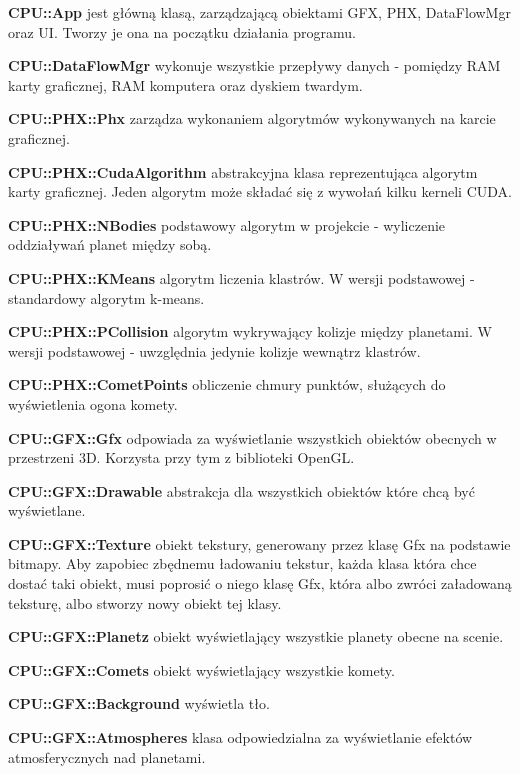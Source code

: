 \begin{description}
\item{\bf CPU::App} jest główną klasą, zarządzającą obiektami GFX, PHX, DataFlowMgr oraz UI. Tworzy je ona na początku działania programu.
\item{\bf CPU::DataFlowMgr} wykonuje wszystkie przepływy danych - pomiędzy RAM karty graficznej, RAM komputera oraz dyskiem twardym.
\item{}
\item{\bf CPU::PHX::Phx} zarządza wykonaniem algorytmów wykonywanych na karcie graficznej.
\item{\bf CPU::PHX::CudaAlgorithm} abstrakcyjna klasa reprezentująca algorytm karty graficznej. Jeden algorytm może składać się z wywołań kilku kerneli CUDA.
\item{\bf CPU::PHX::NBodies} podstawowy algorytm w projekcie - wyliczenie oddziaływań planet między sobą.
\item{\bf CPU::PHX::KMeans} algorytm liczenia klastrów. W wersji podstawowej - standardowy algorytm k-means.
\item{\bf CPU::PHX::PCollision} algorytm wykrywający kolizje między planetami. W wersji podstawowej - uwzględnia jedynie kolizje wewnątrz klastrów.
\item{\bf CPU::PHX::CometPoints} obliczenie chmury punktów, służących do wyświetlenia ogona komety.
\item{}
\item{\bf CPU::GFX::Gfx} odpowiada za wyświetlanie wszystkich obiektów obecnych w przestrzeni 3D. Korzysta przy tym z biblioteki OpenGL.
\item{\bf CPU::GFX::Drawable} abstrakcja dla wszystkich obiektów które chcą być wyświetlane.
\item{\bf CPU::GFX::Texture} obiekt tekstury, generowany przez klasę Gfx na podstawie bitmapy. Aby zapobiec zbędnemu ładowaniu tekstur, każda klasa która chce dostać taki obiekt, musi poprosić o niego klasę Gfx, która albo zwróci załadowaną teksturę, albo stworzy nowy obiekt tej klasy.
\item{\bf CPU::GFX::Planetz} obiekt wyświetlający wszystkie planety obecne na scenie.
\item{\bf CPU::GFX::Comets} obiekt wyświetlający wszystkie komety.
\item{\bf CPU::GFX::Background} wyświetla tło.
\item{\bf CPU::GFX::Atmospheres} klasa odpowiedzialna za wyświetlanie efektów atmosferycznych nad planetami.
\item{}

\end{description}
